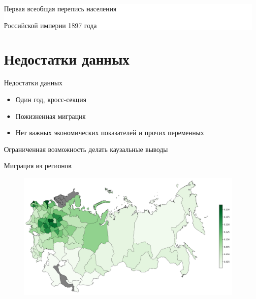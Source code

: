 \documentclass[aspectratio=169]{beamer}
\begin{document}
{
\begin{frame}[b]
\hfill \colorbox{white}{\parbox{0.62\textwidth}{Первая всеобщая перепись населения \par Российской империи 1897 года \citep{census_1897}}}
\bigskip
\end{frame}
}

\section{Недостатки данных}
\begin{frame}{Недостатки данных}

\begin{itemize}
	\item Один год, кросс-секция
	\item Пожизненная миграция
	\item Нет важных экономических показателей и прочих переменных
\end{itemize}
\par
Ограниченная возможность делать каузальные выводы

\end{frame}

\begin{frame}{Миграция из регионов}
	
\begin{figure}[h!]
	\includegraphics[height=0.8\textheight]{mig_of_pop_from.png}
\end{figure}
	
\end{frame}
\end{document}
